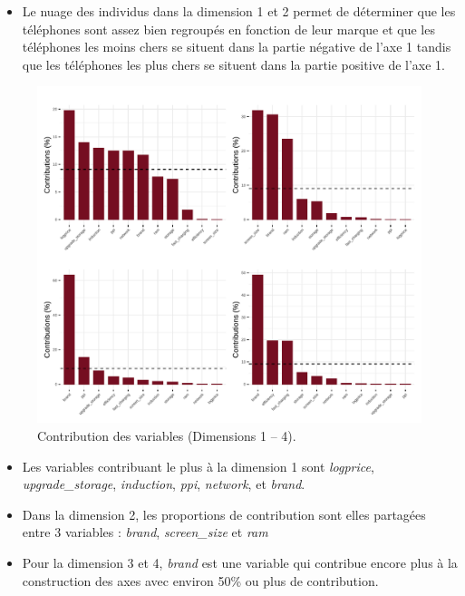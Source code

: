\documentclass[
  12pt,
]{report}
\providecommand{\tightlist}{%
  \setlength{\itemsep}{0pt}\setlength{\parskip}{0pt}}\usepackage{longtable,booktabs,array}
\begin{document}
\begin{itemize}
\tightlist
\item
  Le nuage des individus dans la dimension 1 et 2 permet de déterminer
  que les téléphones sont assez bien regroupés en fonction de leur
  marque et que les téléphones les moins chers se situent dans la partie
  négative de l'axe 1 tandis que les téléphones les plus chers se
  situent dans la partie positive de l'axe 1.
\end{itemize}

\newpage

\begin{figure}[H]

{\centering \includegraphics{report_files/figure-pdf/unnamed-chunk-15-1.pdf}

}

\caption{Contribution des variables (Dimensions 1 -- 4).}

\end{figure}%

\begin{itemize}
\item
  Les variables contribuant le plus à la dimension 1 sont
  \emph{logprice}, \emph{upgrade\_storage}, \emph{induction},
  \emph{ppi}, \emph{network}, et \emph{brand}.
\item
  Dans la dimension 2, les proportions de contribution sont elles
  partagées entre 3 variables : \emph{brand}, \emph{screen\_size} et
  \emph{ram}
\item
  Pour la dimension 3 et 4, \emph{brand} est une variable qui contribue
  encore plus à la construction des axes avec environ 50\% ou plus de
  contribution.
\end{itemize}
\end{document}

